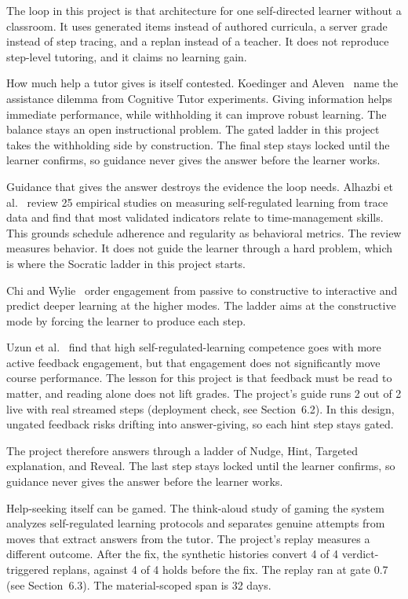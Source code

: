 The loop in this project is that architecture for one self-directed learner without a classroom. It uses generated items instead of authored curricula, a server grade instead of step tracing, and a replan instead of a teacher. It does not reproduce step-level tutoring, and it claims no learning gain.

How much help a tutor gives is itself contested. Koedinger and Aleven~\cite{koedinger2007} name the assistance dilemma from Cognitive Tutor experiments. Giving information helps immediate performance, while withholding it can improve robust learning. The balance stays an open instructional problem. The gated ladder in this project takes the withholding side by construction. The final step stays locked until the learner confirms, so guidance never gives the answer before the learner works.

Guidance that gives the answer destroys the evidence the loop needs. Alhazbi et al.~\cite{alhazbi2024} review 25 empirical studies on measuring self-regulated learning from trace data and find that most validated indicators relate to time-management skills. This grounds schedule adherence and regularity as behavioral metrics. The review measures behavior. It does not guide the learner through a hard problem, which is where the Socratic ladder in this project starts.

Chi and Wylie~\cite{chi2014} order engagement from passive to constructive to interactive and predict deeper learning at the higher modes. The ladder aims at the constructive mode by forcing the learner to produce each step.

Uzun et al.~\cite{uzun2025} find that high self-regulated-learning competence goes with more active feedback engagement, but that engagement does not significantly move course performance. The lesson for this project is that feedback must be read to matter, and reading alone does not lift grades. The project's guide runs 2 out of 2 live with real streamed steps (deployment check, see Section~6.2). In this design, ungated feedback risks drifting into answer-giving, so each hint step stays gated.

The project therefore answers through a ladder of Nudge, Hint, Targeted explanation, and Reveal. The last step stays locked until the learner confirms, so guidance never gives the answer before the learner works.

Help-seeking itself can be gamed. The think-aloud study of gaming the system~\cite{gaming2026} analyzes self-regulated learning protocols and separates genuine attempts from moves that extract answers from the tutor. The project's replay measures a different outcome. After the fix, the synthetic histories convert 4 of 4 verdict-triggered replans, against 4 of 4 holds before the fix. The replay ran at gate 0.7 (see Section~6.3). The material-scoped span is 32 days.

